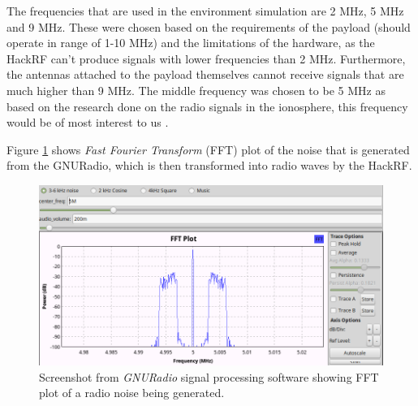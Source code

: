 \documentclass[english,12pt,a4paper,pdftex,elec,utf8]{aaltothesis}
\begin{document}
The frequencies that are used in the environment simulation are 2 MHz, 5 MHz and 9 MHz. These were chosen based on the requirements of the payload (should operate in range of 1-10 MHz) and the limitations of the hardware, as the HackRF can't produce signals with lower frequencies than 2 MHz. Furthermore, the antennas attached to the payload themselves cannot receive signals that are much higher than 9 MHz. The middle frequency was chosen to be 5 MHz as based on the research done on the radio signals in the ionosphere, this frequency would be of most interest to us \cite{esanpapru}.\par 
Figure \ref{gnuradio} shows \textit{Fast Fourier Transform} (FFT) plot of the noise that is generated from the GNURadio, which is then transformed into radio waves by the HackRF.\par
\begin{figure}[h!]
\centering
\includegraphics[scale=0.45]{Test_window}
\caption{Screenshot from \textit{GNURadio} signal processing software showing FFT plot of a radio noise being generated.}
\label{gnuradio}
\end{figure}  
\end{document}
